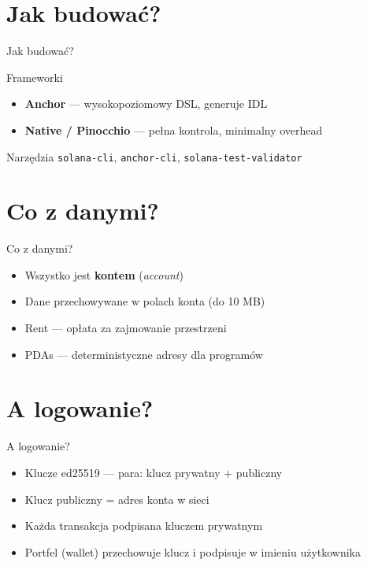\section{Jak budować?}

\begin{frame}{Jak budować?}
  \begin{block}{Frameworki}
    \begin{itemize}
      \item \textbf{Anchor} --- wysokopoziomowy DSL, generuje IDL
      \item \textbf{Native / Pinocchio} --- pełna kontrola, minimalny overhead
    \end{itemize}
  \end{block}
  \vspace{0.4cm}
  \begin{exampleblock}{Narzędzia}
    \texttt{solana-cli}, \texttt{anchor-cli}, \texttt{solana-test-validator}
  \end{exampleblock}
\end{frame}

\section{Co z danymi?}

\begin{frame}{Co z danymi?}
  \begin{itemize}
    \item Wszystko jest \textbf{kontem} (\emph{account})
    \item Dane przechowywane w polach konta (do 10 MB)
    \item Rent --- opłata za zajmowanie przestrzeni
    \item PDAs --- deterministyczne adresy dla programów
  \end{itemize}
\end{frame}

\section{A logowanie?}

\begin{frame}{A logowanie?}
  \begin{itemize}
    \item Klucze ed25519 --- para: klucz prywatny + publiczny
    \item Klucz publiczny = adres konta w sieci
    \item Każda transakcja podpisana kluczem prywatnym
    \item Portfel (wallet) przechowuje klucz i podpisuje w imieniu użytkownika
  \end{itemize}
\end{frame}

